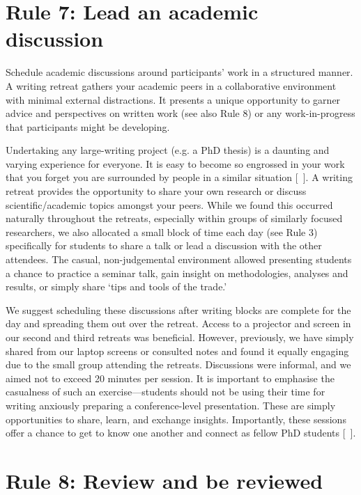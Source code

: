 \documentclass[10pt,letterpaper]{article}
\begin{document}
\section*{Rule 7: Lead an academic discussion}

Schedule academic discussions around participants' work in a structured manner. A writing retreat gathers your academic peers in a collaborative environment with minimal external distractions. It presents a unique opportunity to garner advice and perspectives on written work (see also Rule 8) or any work-in-progress that participants might be developing.

Undertaking any large-writing project (e.g. a PhD thesis) is a daunting and varying experience for everyone. It is easy to become so engrossed in your work that you forget you are surrounded by people in a similar situation [~\cite{wilson2019}]. A writing retreat provides the opportunity to share your own research or discuss scientific/academic topics amongst your peers. While we found this occurred naturally throughout the retreats, especially within groups of similarly focused researchers, we also allocated a small block of time each day (see Rule 3) specifically for students to share a talk or lead a discussion with the other attendees. The casual, non-judgemental environment allowed presenting students a chance to practice a seminar talk, gain insight on methodologies, analyses and results, or simply share `tips and tools of the trade.'

We suggest scheduling these discussions after writing blocks are complete for the day and spreading them out over the retreat. Access to a projector and screen in our second and third retreats was beneficial. However, previously, we have simply shared from our laptop screens or consulted notes and found it equally engaging due to the small group attending the retreats. Discussions were informal, and we aimed not to exceed 20 minutes per session. It is important to emphasise the casualness of such an exercise---students should not be using their time for writing anxiously preparing a conference-level presentation. These are simply opportunities to share, learn, and exchange insights. Importantly, these sessions offer a chance to get to know one another and connect as fellow PhD students [~\cite{omeara2017, bernery2022}].

\section*{Rule 8: Review and be reviewed}
\end{document}

